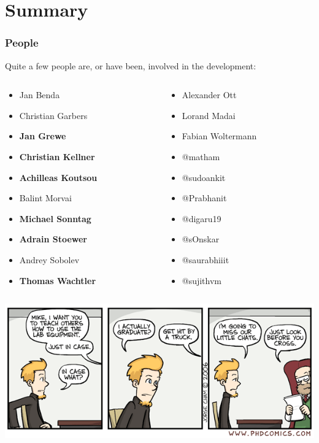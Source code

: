 \documentclass[pdftex, xcolor=table]{beamer}
\begin{document}
\section{Summary} 
\begin{frame}
  \frametitle{People}
  Quite a few people are, or have been, involved in the development:

  \begin{columns}
    \begin{column}{5cm}
      \begin{itemize}
      \item[] Jan Benda
      \item[] Christian Garbers
      \item[] \textbf{Jan Grewe}
      \item[] \textbf{Christian Kellner}
      \item[] \textbf{Achilleas Koutsou}
      \item[] Balint Morvai
      \item[] \textbf{Michael Sonntag}
      \item[] \textbf{Adrain Stoewer}
      \item[] Andrey Sobolev
      \item[] \textbf{Thomas Wachtler}
      \end{itemize}
    \end{column}
    \begin{column}{5cm}
      \begin{itemize}
      \item[] Alexander Ott
      \item[] Lorand Madai
      \item[] Fabian Woltermann
      \item[] @matham
      \item[] @sudoankit
      \item[] @Prabhanit
      \item[] @digaru19
      \item[] @sOnskar
      \item[] @saurabhiiit
      \item[] @sujithvm
      \end{itemize}
    \end{column}
  \end{columns}
\end{frame}


\begin{frame}
   \begin{center}
   \includegraphics[width=0.95\columnwidth]{images/phd092506s.png}
  \end{center}
\end{frame}
\end{document}
